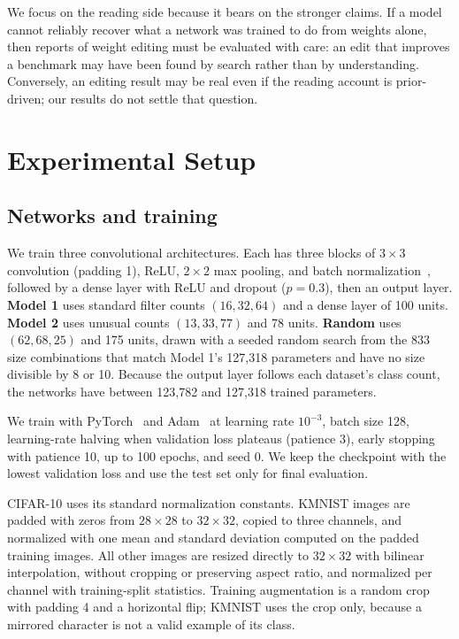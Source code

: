 \documentclass[11pt]{article}
\begin{document}
We focus on the reading side because it bears on the stronger claims. If a model cannot reliably recover what a network was trained to do from weights alone, then reports of weight editing must be evaluated with care: an edit that improves a benchmark may have been found by search rather than by understanding. Conversely, an editing result may be real even if the reading account is prior-driven; our results do not settle that question.

\section{Experimental Setup}

\subsection{Networks and training}

We train three convolutional architectures. Each has three blocks of $3\times3$ convolution (padding 1), ReLU, $2\times2$ max pooling, and batch normalization~\cite{ioffe}, followed by a dense layer with ReLU and dropout ($p=0.3$), then an output layer. \textbf{Model 1} uses standard filter counts $(16,32,64)$ and a dense layer of 100 units. \textbf{Model 2} uses unusual counts $(13,33,77)$ and 78 units. \textbf{Random} uses $(62,68,25)$ and 175 units, drawn with a seeded random search from the 833 size combinations that match Model 1's 127,318 parameters and have no size divisible by 8 or 10. Because the output layer follows each dataset's class count, the networks have between 123,782 and 127,318 trained parameters.

We train with PyTorch~\cite{paszke} and Adam~\cite{kingma} at learning rate $10^{-3}$, batch size 128, learning-rate halving when validation loss plateaus (patience 3), early stopping with patience 10, up to 100 epochs, and seed 0. We keep the checkpoint with the lowest validation loss and use the test set only for final evaluation.

CIFAR-10 uses its standard normalization constants. KMNIST images are padded with zeros from $28\times28$ to $32\times32$, copied to three channels, and normalized with one mean and standard deviation computed on the padded training images. All other images are resized directly to $32\times32$ with bilinear interpolation, without cropping or preserving aspect ratio, and normalized per channel with training-split statistics. Training augmentation is a random crop with padding 4 and a horizontal flip; KMNIST uses the crop only, because a mirrored character is not a valid example of its class.
\end{document}

